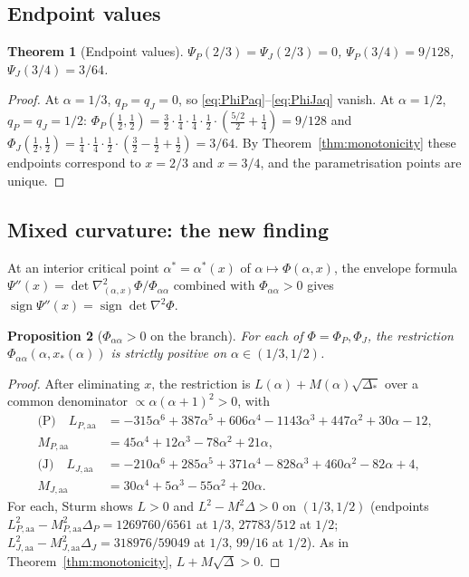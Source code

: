 \documentclass[11pt]{amsart}
\newtheorem{theorem}{Theorem}[section]
\newtheorem{proposition}[theorem]{Proposition}
\theoremstyle{definition}
\newcommand{\1}{\mathbf 1}
\begin{document}
\subsection{Endpoint values}

\begin{theorem}[Endpoint values]
\label{thm:endpoints}
$\Psi_P(2/3) = \Psi_J(2/3) = 0$, $\Psi_P(3/4) = 9/128$, $\Psi_J(3/4) = 3/64$.
\end{theorem}

\begin{proof}
At $\alpha=1/3$, $q_P=q_J=0$, so \eqref{eq:PhiPaq}--\eqref{eq:PhiJaq} vanish.  At
$\alpha=1/2$, $q_P=q_J=1/2$:
$\Phi_P(\tfrac12,\tfrac12)=\tfrac32\cdot\tfrac14\cdot\tfrac14\cdot\tfrac12\cdot
(\tfrac{5/2}{2}+\tfrac14)=9/128$ and
$\Phi_J(\tfrac12,\tfrac12)=\tfrac14\cdot\tfrac14\cdot\tfrac12\cdot
(\tfrac32-\tfrac12+\tfrac12)=3/64$.  By Theorem~\ref{thm:monotonicity} these
endpoints correspond to $x=2/3$ and $x=3/4$, and the parametrisation points are
unique.
\end{proof}

\subsection{Mixed curvature: the new finding}
\label{ssec:cert-curvature}

At an interior critical point $\alpha^*=\alpha^*(x)$ of
$\alpha\mapsto\Phi(\alpha,x)$, the envelope formula
$\Psi''(x) = \det\nabla^2_{(\alpha,x)}\Phi/\Phi_{\alpha\alpha}$ combined with
$\Phi_{\alpha\alpha}>0$ gives
$\operatorname{sign}\Psi''(x)=\operatorname{sign}\det\nabla^2\Phi$.

\begin{proposition}[$\Phi_{\alpha\alpha}>0$ on the branch]
\label{prop:Phiaa-positive}
For each of $\Phi=\Phi_P,\Phi_J$, the restriction
$\Phi_{\alpha\alpha}(\alpha,x_*(\alpha))$ is strictly positive on
$\alpha\in(1/3,1/2)$.
\end{proposition}

\begin{proof}
After eliminating $x$, the restriction is $L(\alpha)+M(\alpha)\sqrt{\Delta_*}$
over a common denominator $\propto\alpha(\alpha+1)^2>0$, with
\begin{align*}
\text{(P)}\quad L_{P,\mathrm{aa}} &= -315\alpha^6+387\alpha^5+606\alpha^4-1143\alpha^3+447\alpha^2+30\alpha-12,\\
            M_{P,\mathrm{aa}} &= 45\alpha^4+12\alpha^3-78\alpha^2+21\alpha,\\
\text{(J)}\quad L_{J,\mathrm{aa}} &= -210\alpha^6+285\alpha^5+371\alpha^4-828\alpha^3+460\alpha^2-82\alpha+4,\\
            M_{J,\mathrm{aa}} &= 30\alpha^4+5\alpha^3-55\alpha^2+20\alpha.
\end{align*}
For each, Sturm shows $L>0$ and $L^2-M^2\Delta>0$ on $(1/3,1/2)$ (endpoints
$L_{P,\mathrm{aa}}^2-M_{P,\mathrm{aa}}^2\Delta_P=1269760/6561$ at $1/3$, $27783/512$
at $1/2$; $L_{J,\mathrm{aa}}^2-M_{J,\mathrm{aa}}^2\Delta_J=318976/59049$ at $1/3$,
$99/16$ at $1/2$).  As in Theorem~\ref{thm:monotonicity}, $L+M\sqrt\Delta>0$.
\end{proof}
\end{document}
